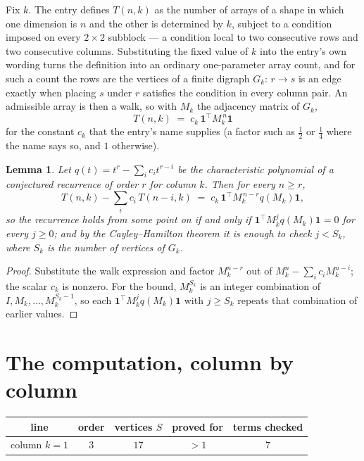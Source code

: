 \documentclass[11pt,a4paper]{article}
\theoremstyle{plain}
\newtheorem{lemma}[theorem]{Lemma}
\theoremstyle{definition}
\begin{document}
Fix $k$. The entry defines $T(n,k)$ as the number of arrays of a shape in which one dimension
is $n$ and the other is determined by $k$, subject to a condition imposed on every
$2\times2$ subblock --- a condition local to two consecutive rows and two consecutive columns.
Substituting the fixed value of $k$ into the entry's own wording turns the definition into an
ordinary one-parameter array count, and for such a count the rows are the vertices of a finite
digraph $G_k$: $r\to s$ is an edge exactly when placing $s$ under $r$ satisfies the condition
in every column pair. An admissible array is then a walk, so with $M_k$ the adjacency matrix
of $G_k$,
\[
T(n,k)\;=\;c_k\,\mathbf{1}^{\!\top}M_k^{\,n}\mathbf{1}
\]
for the constant $c_k$ that the entry's name supplies (a factor such as $\tfrac12$ or
$\tfrac14$ where the name says so, and $1$ otherwise).

\begin{lemma}\label{lem:crit}
Let $q(t)=t^{r}-\sum_i c_it^{r-i}$ be the characteristic polynomial of a conjectured
recurrence of order $r$ for column $k$. Then for every $n\ge r$,
\[
T(n,k)-\sum_i c_i\,T(n-i,k)\;=\;c_k\,\mathbf{1}^{\!\top}M_k^{\,n-r}q(M_k)\mathbf{1},
\]
so the recurrence holds from some point on if and only if
$\mathbf{1}^{\!\top}M_k^{j}q(M_k)\mathbf{1}=0$ for every $j\ge0$; and by the
Cayley--Hamilton theorem it is enough to check $j<S_k$, where $S_k$ is the number of vertices
of $G_k$.
\end{lemma}

\begin{proof}
Substitute the walk expression and factor $M_k^{n-r}$ out of $M_k^{n}-\sum_ic_iM_k^{n-i}$;
the scalar $c_k$ is nonzero. For the bound, $M_k^{S_k}$ is an integer combination of
$I,M_k,\dots,M_k^{S_k-1}$, so each $\mathbf{1}^{\!\top}M_k^{j}q(M_k)\mathbf{1}$ with
$j\ge S_k$ repeats that combination of earlier values.
\end{proof}

\section{The computation, column by column}

\begin{center}
\begin{tabular}{ccccc}
line & order & vertices $S$ & proved for & terms checked \\ \hline
column $k$$=1$ & $3$ & $17$ & $>1$ & $7$ \\
\end{tabular}
\end{center}
\end{document}

